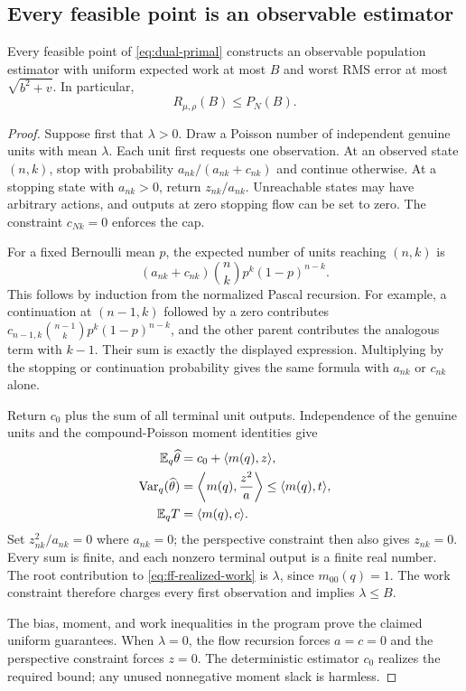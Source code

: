 \subsection{Every feasible point is an observable estimator}

\begin{proposition}
\label{prop:ff-realization}
Every feasible point of \eqref{eq:dual-primal} constructs an observable
population estimator with uniform expected work at most $B$ and
worst RMS error at most $\sqrt{b^2+v}$. In particular,
\[
 R_{\mu,\rho}(B)\le P_N(B).
\]
\end{proposition}

\begin{proof}
Suppose first that $\lambda>0$. Draw a Poisson number of independent
genuine units with mean $\lambda$. Each unit first requests one
observation. At an observed state $(n,k)$, stop with probability
$a_{nk}/(a_{nk}+c_{nk})$ and continue otherwise. At a stopping state
with $a_{nk}>0$, return $z_{nk}/a_{nk}$. Unreachable states may have
arbitrary actions, and outputs at zero stopping flow can be set to
zero. The constraint $c_{Nk}=0$ enforces the cap.

For a fixed Bernoulli mean $p$, the expected number of units reaching
$(n,k)$ is
\[
 (a_{nk}+c_{nk})\binom nk p^k(1-p)^{n-k}.
\]
This follows by induction from the normalized Pascal recursion.
For example, a continuation at $(n-1,k)$ followed by a zero
contributes
$c_{n-1,k}\binom{n-1}{k}p^k(1-p)^{n-k}$, and the other parent
contributes the analogous term with $k-1$. Their sum is exactly the
displayed expression. Multiplying by the stopping or continuation
probability gives the same formula with $a_{nk}$ or $c_{nk}$ alone.

Return $c_0$ plus the sum of all terminal unit outputs. Independence
of the genuine units and the compound-Poisson moment identities give
\begin{align}
 \mathbb E_q\widehat\theta
 &=c_0+\langle m(q),z\rangle,\label{eq:ff-realized-mean}\\
 \operatorname{Var}_q(\widehat\theta)
 &=\left\langle m(q),\frac{z^2}{a}\right\rangle
 \le\langle m(q),t\rangle,\label{eq:ff-realized-variance}\\
 \mathbb E_qT&=\langle m(q),c\rangle.\label{eq:ff-realized-work}
\end{align}
Set $z_{nk}^2/a_{nk}=0$ where $a_{nk}=0$; the perspective constraint
then also gives $z_{nk}=0$. Every sum is finite, and each nonzero
terminal output is a finite real number. The root contribution to
\eqref{eq:ff-realized-work} is $\lambda$, since $m_{00}(q)=1$.
The work constraint therefore charges every first observation and
implies $\lambda\le B$.

The bias, moment, and work inequalities in the program prove the
claimed uniform guarantees. When $\lambda=0$, the flow recursion
forces $a=c=0$ and the perspective constraint forces $z=0$.
The deterministic estimator $c_0$ realizes the required bound;
any unused nonnegative moment slack is harmless.
\end{proof}

